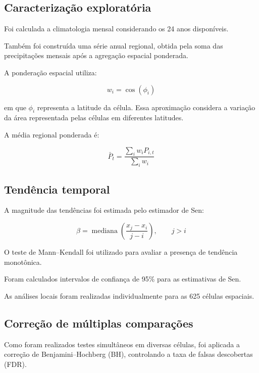 \documentclass[12pt,a4paper]{article}
\begin{document}
\subsection{Caracterização exploratória}

Foi calculada a climatologia mensal considerando os
24 anos disponíveis.

Também foi construída uma série anual regional,
obtida pela soma das precipitações mensais após a
agregação espacial ponderada.

A ponderação espacial utiliza:

\begin{equation}
w_i = \cos(\phi_i)
\end{equation}

em que $\phi_i$ representa a latitude da célula.
Essa aproximação considera a variação da área
representada pelas células em diferentes latitudes.

A média regional ponderada é:

\begin{equation}
\bar{P}_t =
\frac{\sum_i w_i P_{i,t}}
{\sum_i w_i}
\end{equation}

\subsection{Tendência temporal}

A magnitude das tendências foi estimada pelo
estimador de Sen:

\begin{equation}
\beta =
\operatorname{mediana}
\left(
\frac{x_j-x_i}{j-i}
\right),
\qquad j>i
\end{equation}

O teste de Mann--Kendall foi utilizado para avaliar
a presença de tendência monotônica.

Foram calculados intervalos de confiança de 95\%
para as estimativas de Sen.

As análises locais foram realizadas individualmente
para as 625 células espaciais.

\subsection{Correção de múltiplas comparações}

Como foram realizados testes simultâneos em diversas
células, foi aplicada a correção de Benjamini--Hochberg
(BH), controlando a taxa de falsas descobertas (FDR).
\end{document}
